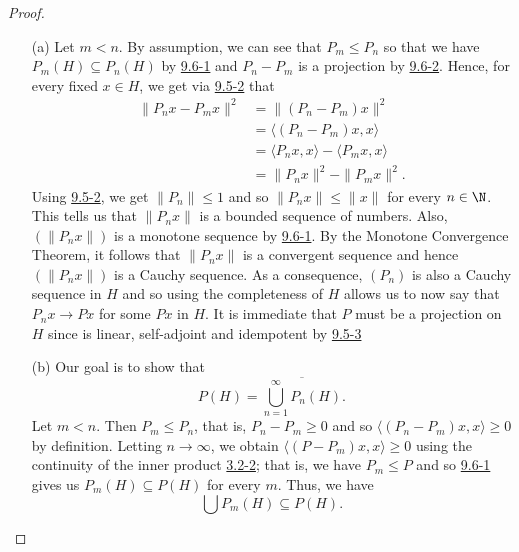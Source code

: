     \begin{proof}
    \begin{enumerate}
        \item[(a)] Let \( m < n  \). By assumption, we can see that \( {P}_{m} \leq {P}_{n}  \) so that we have \( {P}_{m}(H) \subseteq  {P}_{n}(H) \) by {\hyperref[9.6-1]{9.6-1}} and \( {P}_{n} - {P}_{m}  \) is a projection by {\hyperref[9.6-2]{9.6-2}}. Hence, for every fixed \( x \in H  \), we get via {\hyperref[9.5-2]{9.5-2}} that 
            \begin{align*}
                \|{P}_{n}x -  {P}_{m}x\|^{2} &= \|({P}_{n} - {P}_{m})x\|^{2} \\
                                             &= \langle ({P}_{n} - {P}_{m})x  ,  x \rangle \\
                                             &= \langle {P}_{n} x  ,  x  \rangle - \langle {P}_{m}x  , x  \rangle \\
                                             &= \|{P}_{n}x\|^{2} - \|{P}_{m}x\|^{2}.
            \end{align*}
            Using {\hyperref[9.5-2]{9.5-2}}, we get \( \|{P}_{n}\| \leq 1  \) and so \( \|{P}_{n}x \| \leq \|x \|  \) for every \( n \in \N \). This tells us that \( \|{P}_{n}x\| \) is a bounded sequence of numbers. Also, \( (\|{P}_{n}x\|) \) is a monotone sequence by {\hyperref[9.6-1]{9.6-1}}. By the Monotone Convergence Theorem, it follows that \( \|{P}_{n}x\| \) is a convergent sequence and hence \( (\|{P}_{n}x\|) \) is a Cauchy sequence. As a consequence, \( ({P}_{n})  \) is also a Cauchy sequence in \( H  \) and so using the completeness of \( H  \) allows us to now say that \( {P}_{n}x \to Px   \) for some \( Px  \) in \( H  \). It is immediate that \( P  \) must be a projection on \( H  \) since is linear, self-adjoint and idempotent by {\hyperref[9.5-3]{9.5-3}} 
        \item[(b)] Our goal is to show that 
            \[  P(H) = \overline{\bigcup_{ n=1  }^{ \infty  }  {P}_{n}(H)}. \]
            Let \( m < n  \). Then \( {P}_{m} \leq {P}_{n} \), that is, \( {P}_{n} - {P}_{m} \geq 0  \) and so \( \langle ({P}_{n} - {P}_{m})x  , x  \rangle \geq 0  \) by definition. Letting \( n \to \infty   \), we obtain \( \langle (P - {P}_{m})x  ,  x  \rangle \geq 0  \) using the continuity of the inner product {\hyperref[3.2-2]{3.2-2}}; that is, we have \( {P}_{m} \leq P  \) and so {\hyperref[9.6-1]{9.6-1}} gives us \( {P}_{m}(H) \subseteq P(H)  \) for every \( m  \). Thus, we have 
            \[  \bigcup {P}_{m}(H) \subseteq P(H). \]

\end{enumerate}
\end{proof}
